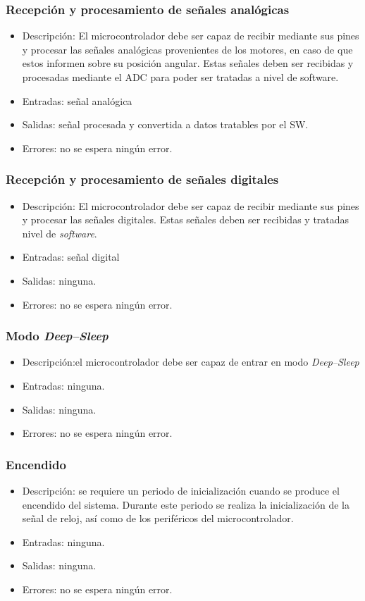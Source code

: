 \subsubsection{Recepción y procesamiento de señales analógicas}
\begin{itemize}
    \item Descripción: El microcontrolador debe ser capaz de recibir mediante sus pines y procesar las señales analógicas provenientes de los motores, en caso de que estos informen sobre su posición angular. Estas señales deben ser recibidas y procesadas mediante el \ac{ADC} para poder ser tratadas a nivel de software.
    \item Entradas: señal analógica
    \item Salidas: señal procesada y convertida a datos tratables por el \ac{SW}.
    \item Errores: no se espera ningún error.
    \end{itemize}
\subsubsection{Recepción y procesamiento de señales digitales}
\begin{itemize}
    \item Descripción: El microcontrolador debe ser capaz de recibir mediante sus pines y procesar las señales digitales. Estas señales deben ser recibidas y tratadas nivel de \textit{software}.
    \item Entradas: señal digital
    \item Salidas: ninguna.
    \item Errores: no se espera ningún error.    
\end{itemize}
\subsubsection{Modo \textit{Deep--Sleep}}
\begin{itemize}
    \item Descripción:el microcontrolador debe ser capaz de entrar en modo \textit{Deep--Sleep}
    \item Entradas: ninguna.
    \item Salidas: ninguna.
    \item Errores: no se espera ningún error.
\end{itemize}
\subsubsection{Encendido}
\begin{itemize}
    \item Descripción: se requiere un periodo de inicialización cuando se produce el encendido del sistema. Durante este periodo se realiza la inicialización de la señal de reloj, así como de los periféricos del microcontrolador. 
    \item Entradas: ninguna.
    \item Salidas: ninguna.
    \item Errores: no se espera ningún error.
\end{itemize}
